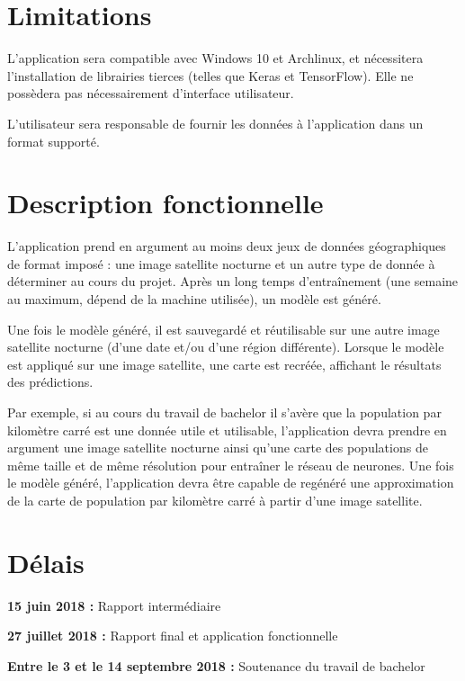 \documentclass[a4paper, 11pt]{report}
\begin{document}
\section{Limitations}
L'application sera compatible avec Windows 10 et Archlinux, et nécessitera l'installation de librairies tierces (telles que Keras et TensorFlow).
Elle ne possèdera pas nécessairement d'interface utilisateur.

L'utilisateur sera responsable de fournir les données à l'application dans un format supporté.

\section{Description fonctionnelle}
L'application prend en argument au moins deux jeux de données géographiques de format imposé : une image satellite nocturne et un autre type de donnée à déterminer au cours du projet. Après un long temps d'entraînement (une semaine au maximum, dépend de la machine utilisée), un modèle est généré.

Une fois le modèle généré, il est sauvegardé et réutilisable sur une autre image satellite nocturne (d'une date et/ou d'une région différente). Lorsque le modèle est appliqué sur une image satellite, une carte est recréée, affichant le résultats des prédictions.

Par exemple, si au cours du travail de bachelor il s'avère que la population par kilomètre carré est une donnée utile et utilisable, l'application devra prendre en argument une image satellite nocturne ainsi qu'une carte des populations de même taille et de même résolution pour entraîner le réseau de neurones. Une fois le modèle généré, l'application devra être capable de regénéré une approximation de la carte de population par kilomètre carré à partir d'une image satellite.

\section{Délais}
\textbf{15 juin 2018 :} Rapport intermédiaire

\textbf{27 juillet 2018 :} Rapport final et application fonctionnelle

\textbf{Entre le 3 et le 14 septembre 2018 :} Soutenance du travail de bachelor

\end{document}

